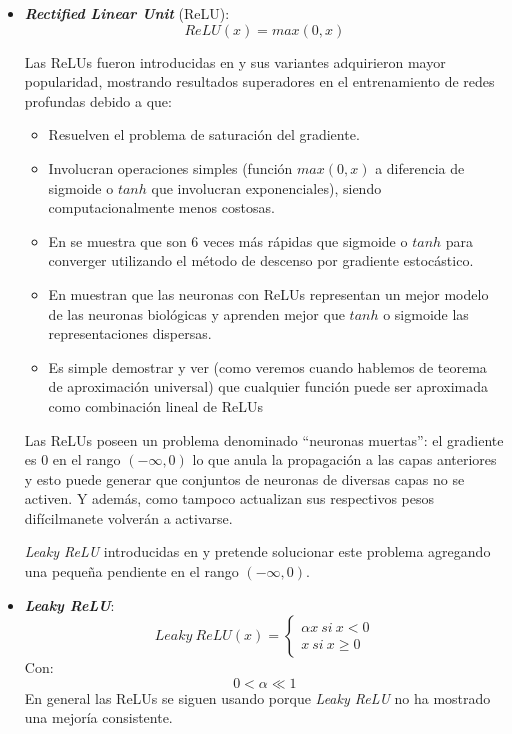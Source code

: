\begin{itemize}
    \item \textit{\textbf{ Rectified Linear Unit}} (ReLU):
    \begin{equation*}
        ReLU(x) = max(0,x)
    \end{equation*}
    
    Las ReLUs fueron introducidas en \cite{relu-def} y sus variantes adquirieron mayor popularidad, mostrando resultados superadores en el entrenamiento de redes profundas debido a que:
    \begin{itemize}
        \item Resuelven el problema de saturación del gradiente.
        \item  Involucran operaciones simples (función $max(0,x)$ a diferencia de sigmoide o $tanh$ que involucran exponenciales), siendo computacionalmente menos costosas.
        \item En \cite{relu-fast} se muestra que son 6 veces más rápidas que sigmoide o $tanh$ para converger utilizando el método de descenso por gradiente estocástico.
        \item En \cite{relu-biology} muestran que las neuronas con ReLUs representan un mejor modelo de las neuronas biológicas y aprenden mejor que $tanh$ o sigmoide las representaciones dispersas.
        \item Es simple demostrar y ver (como veremos cuando hablemos de teorema de aproximación universal) que cualquier función puede ser aproximada como combinación lineal de ReLUs
    \end{itemize}

    Las ReLUs poseen un problema denominado ``neuronas muertas'': el gradiente es $0$ en el rango $(-\infty, 0)$ lo que anula la propagación a las capas anteriores y esto puede generar que conjuntos de neuronas de diversas capas no se activen. Y además, como tampoco actualizan sus respectivos pesos difícilmanete volverán a activarse.
    
    \textit{Leaky ReLU} introducidas en \cite{leaky-relu1} y \cite{leaky-relu2} pretende solucionar este problema agregando una pequeña pendiente en el rango $(-\infty, 0)$.

    
    \item \textit{\textbf{ Leaky ReLU}}:
    \begin{equation*}
        Leaky~ReLU(x) = \left\lbrace\begin{array}{c} \alpha x~si~x<0 \\  x~si~x \geq 0 \end{array}\right.
    \end{equation*}
    Con:
    \begin{equation*}
        0 < \alpha \ll 1
    \end{equation*}
    En general las ReLUs se siguen usando porque \textit{Leaky ReLU} no ha mostrado una mejoría consistente.
    

\end{itemize}
